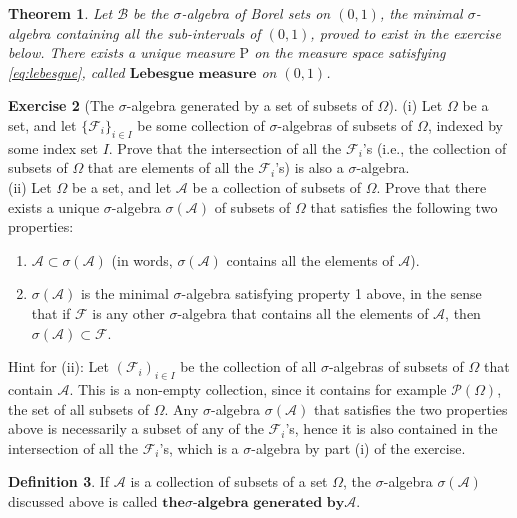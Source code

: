 \documentclass[11pt]{report}
\providecommand{\cal}{\mathcal}
\theoremstyle{plain}
\newtheorem{thm}{Theorem}[chapter]
\theoremstyle{definition}
\newtheorem{defn}[thm]{Definition}
\newtheorem{xexercise}[thm]{Exercise}
\begin{document}
\begin{thm}
\label{thm-lebesgue}
Let ${\cal B}$ be the $\sigma$-algebra of Borel sets
on $(0,1)$, the minimal $\sigma$-algebra containing
all the sub-intervals of $(0,1)$, proved to exist in
the exercise below. There exists a unique measure
$\mathrm{P}$ on the measure space satisfying
\eqref{eq:lebesgue}, called $\textbf{Lebesgue measure}$
on $(0,1)$.
\end{thm}

\begin{xexercise}[The $\sigma$-algebra generated by a set of subsets of $\Omega$]
(i) Let $\Omega$ be a set, and let
$\{{\cal F}_i\}_{i\in I}$ be some collection of
$\sigma$-algebras of subsets of $\Omega$, indexed by
some index set $I$. Prove that the intersection of
all the ${\cal F}_i$'s (i.e., the collection of
subsets of $\Omega$ that are elements of all the
${\cal F}_i$'s) is also a $\sigma$-algebra. \\ (ii)
Let $\Omega$ be a set, and let ${\cal A}$ be a
collection of subsets of $\Omega$. Prove that there
exists a unique $\sigma$-algebra $\sigma({\cal A})$
of subsets of $\Omega$ that satisfies the following
two properties:

\begin{enumerate}[label=\arabic*.]
\item ${\cal A} \subset \sigma({\cal A})$ (in words,
$\sigma({\cal A})$ contains all the elements of
${\cal A}$).

\item $\sigma({\cal A})$ is the minimal $\sigma$-algebra
satisfying property 1 above, in the sense that if
${\cal F}$ is any other $\sigma$-algebra that
contains all the elements of ${\cal A}$, then
$\sigma({\cal A}) \subset {\cal F}$.
\end{enumerate}

\noindent Hint for (ii): Let $({\cal F}_i)_{i\in I}$ be the
collection of all $\sigma$-algebras of subsets of
$\Omega$ that contain ${\cal A}$. This is a non-empty
collection, since it contains for example
${\cal P}(\Omega)$, the set of all subsets of
$\Omega$. Any $\sigma$-algebra $\sigma({\cal A})$
that satisfies the two properties above is necessarily
a subset of any of the ${\cal F}_i$'s, hence it is
also contained in the intersection of all the
${\cal F}_i$'s, which is a $\sigma$-algebra by part
(i) of the exercise.
\end{xexercise}

\begin{defn}
If ${\cal A}$ is a collection of subsets of a set
$\Omega$, the $\sigma$-algebra $\sigma({\cal A})$
discussed above is called $\textbf{the$\sigma
$-algebra generated by${\cal A}$}$.
\end{defn}
\end{document}
